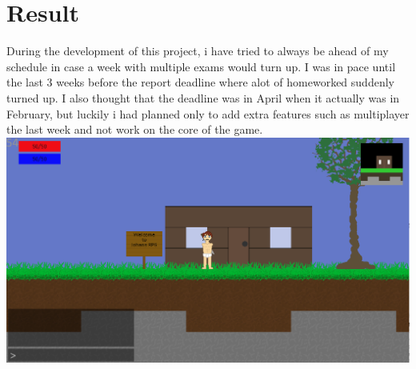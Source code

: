 \documentclass[a4paper,12pt]{article}
\begin{document}
\clearpage

\section{Result}

During the development of this project, i have tried to always be ahead of my schedule in case a week with multiple exams would turn up.
I was in pace until the last 3 weeks before the report deadline where alot of homeworked suddenly turned up.
I also thought that the deadline was in April when it actually was in February, but luckily i had planned only to add extra features such as multiplayer the last week and not work on the core of the game.
\\


\hspace{-20pt}
\includegraphics[width=\textwidth]{img/screenshot1.eps}
\end{document}
